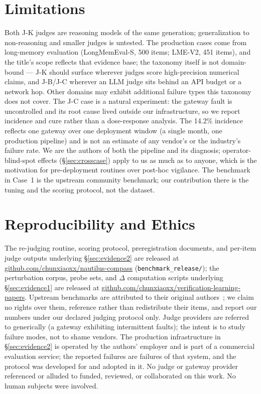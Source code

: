 \documentclass[11pt]{article}
\begin{document}
\section{Limitations}
\label{sec:limitations}

Both J-K judges are reasoning models of the same generation; generalization
to non-reasoning and smaller judges is untested. The production cases come
from long-memory evaluation (LongMemEval-S, 500 items; LME-V2, 451 items),
and the title's scope reflects that evidence base; the taxonomy itself is
not domain-bound --- J-K should surface wherever judges score high-precision
numerical claims, and J-B/J-C wherever an LLM judge sits behind an API
budget or a network hop. Other domains may exhibit additional failure types
this taxonomy does not cover. The J-C case is a natural experiment: the gateway fault is
uncontrolled and its root cause lived outside our infrastructure, so we
report incidence and cure rather than a dose-response analysis. The 14.2\%
incidence reflects one gateway over one deployment window (a single month,
one production pipeline) and is not an estimate of any vendor's or the
industry's failure rate. We are the
authors of both the pipeline and its diagnosis; operator-blind-spot effects
(\S\ref{sec:crosscase}) apply to us as much as to anyone, which is the
motivation for pre-deployment routines over post-hoc vigilance. The
benchmark in Case~1 is the upstream community benchmark; our contribution
there is the tuning and the scoring protocol, not the dataset.

\section{Reproducibility and Ethics}
\label{sec:repro}

The re-judging routine, scoring protocol, preregistration documents, and
per-item judge outputs underlying \S\ref{sec:evidence2} are released at
\url{github.com/chunxiaoxx/nautilus-compass} (\texttt{benchmark\_release/});
the perturbation corpus, probe sets, and $\Delta$ computation scripts
underlying \S\ref{sec:evidence1} are released at
\url{github.com/chunxiaoxx/verification-learning-papers}. Upstream
benchmarks are attributed to their original authors~\cite{longmemeval,lmev2};
we claim no rights over them, reference rather than redistribute their items,
and report our numbers under our declared judging protocol only. Judge
providers are referred to
generically (a gateway exhibiting intermittent faults); the intent is to
study failure modes, not to shame vendors. The production infrastructure in
\S\ref{sec:evidence2} is operated by the authors' employer and is part of a
commercial evaluation service; the reported failures are failures of that
system, and the protocol was developed for and adopted in it. No judge or
gateway provider referenced or alluded to funded, reviewed, or collaborated
on this work. No human subjects were involved.
\end{document}
